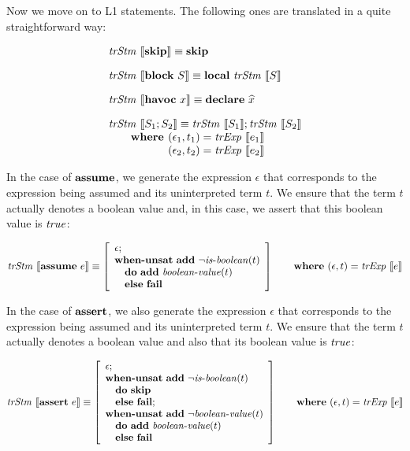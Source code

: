 Now we move on to L1 statements. The following ones are translated in a 
quite straightforward way:

\[
\begin{array}{l}
\trStm{\skipE} \equiv \skipE\\[1em]
\trStm{\blockE~S} \equiv \localE~\trStm{S}\\[1em]
\trStm{\havocE~x} \equiv \declareE{\widehat{x}}\\[1em]
\trStm{S_1;S_2} \equiv \trStm{S_1};\trStm{S_2}\\
\qquad \textbf{where }(\epsilon_1, t_1) = \trExps{e_1}\\
\qquad \phantom{\textbf{where }}(\epsilon_2, t_2) = \trExps{e_2}
\end{array}
\]

In the case of $\textbf{assume}$, we generate the expression $\epsilon$ that 
corresponds to the expression being assumed and its uninterpreted term $t$. 
We ensure that the term $t$ actually denotes a boolean value and, in this 
case, we assert that this boolean value is $\mathit{true}$:

\[
\mathit{trStm}~\llbracket\textbf{assume}~e\rrbracket \equiv 
\left[\begin{array}{l}
\epsilon;\\
\textbf{when-unsat}~\textbf{add}~\neg\mathit{is\mbox{-}boolean}(t)\\
\quad\textbf{do}~\textbf{add}~\mathit{boolean\mbox{-}value}(t)\\
\quad\textbf{else}~\textbf{fail}\\
\end{array}\right]
\qquad \textbf{where}~(\epsilon, t) = \mathit{trExp}~\llbracket e\rrbracket
\]

In the case of $\textbf{assert}$, we also generate the expression $\epsilon$ that 
corresponds to the expression being assumed and its uninterpreted term $t$. 
We ensure that the term $t$ actually denotes a boolean value and also that 
its boolean value is $\mathit{true}$:

\[
\mathit{trStm}~\llbracket\textbf{assert}~e\rrbracket \equiv
\left[\begin{array}{l}
\epsilon;\\
\textbf{when-unsat}~\textbf{add}~\neg\mathit{is\mbox{-}boolean}(t)\\
\quad\textbf{do}~\textbf{skip}\\
\quad\textbf{else}~\textbf{fail};\\
\textbf{when-unsat}~\textbf{add}~\neg\mathit{boolean\mbox{-}value}(t)\\
\quad\textbf{do}~\textbf{add}~\mathit{boolean\mbox{-}value}(t)\\
\quad\textbf{else}~\textbf{fail}\\
\end{array}\right]
\qquad \textbf{where}~(\epsilon, t) = \mathit{trExp}~\llbracket e\rrbracket
\]

